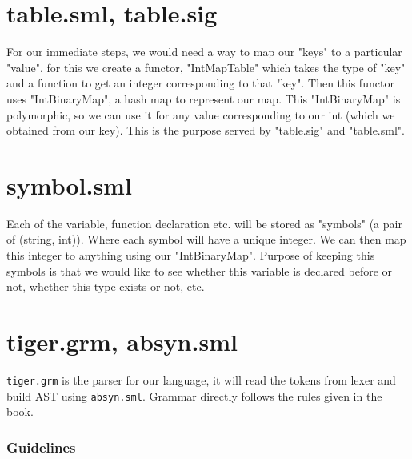 \section{table.sml, table.sig}

For our immediate steps, we would need a way to map our "keys" to a particular "value", for this we create a functor, "IntMapTable" which takes the type of "key" and a function to get an integer corresponding to that "key". Then this functor uses "IntBinaryMap", a hash map to represent our map. This "IntBinaryMap" is polymorphic, so we can use it for any value corresponding to our int (which we obtained from our key). This is the purpose served by "table.sig" and "table.sml". 

\section{symbol.sml}

Each of the variable, function declaration etc. will be stored as "symbols" (a pair of (string, int)). Where each symbol will have a unique integer. We can then map this integer to anything using our "IntBinaryMap". Purpose of keeping this symbols is that we would like to see whether this variable is declared before or not, whether this type exists or not, etc.

\section{tiger.grm, absyn.sml}

\texttt{tiger.grm} is the parser for our language, it will read the tokens from lexer and build AST using \texttt{absyn.sml}. Grammar directly follows the rules given in the book. 

\subsubsection{Guidelines}

